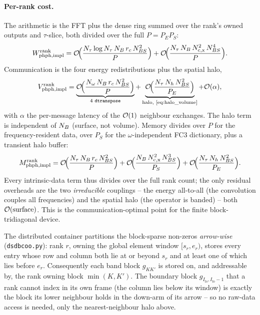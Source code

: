 \paragraph{Per-rank cost.} The arithmetic is the FFT plus the
dense ring summed over the rank's owned outputs and $\tau$-slice,
both divided over the full $P=P_EP_S$:
\begin{equation}\label{eq:cost_phph_impl}
  W^\mathrm{rank}_{\mathrm{phph,impl}}
  = \mathcal{O}\!\Bigl(
      \frac{N_\tau\log N_\tau\,N_{B}\,r_c\,N_{BS}^{2}}{P}
    \Bigr)
  + \mathcal{O}\!\Bigl(
      \frac{N_\tau\,N_{B}\,N_\mathrm{c,x}^{2}\,N_{BS}^{4}}{P}
    \Bigr).
\end{equation}
Communication is the four energy redistributions plus the spatial
halo,
\begin{equation}\label{eq:vol_phph_impl}
  V^\mathrm{rank}_{\mathrm{phph,impl}}
  = \underbrace{\cO\!\Bigl(\frac{N_\omega\,\NB\,r_c\,\NBS^{2}}{P}\Bigr)}_{\text{4 \texttt{dtranspose}}}
  + \underbrace{\cO\!\Bigl(\frac{N_\tau\,N_h\,\NBS^{2}}{P_E}\Bigr)}_{\text{halo, \cref{eq:halo_volume}}}
  + \cO(\alpha),
\end{equation}
with $\alpha$ the per-message latency of the $\mathcal{O}(1)$ neighbour
exchanges. The halo term is independent of $N_{B}$ (surface, not
volume). Memory divides over $P$ for the frequency-resident data,
over $P_S$ for the $\omega$-independent FC3 dictionary, plus a
transient halo buffer:
\begin{equation}\label{eq:mem_phph_impl}
  M^\mathrm{rank}_{\mathrm{phph,impl}}
  = \mathcal{O}\!\Bigl(\frac{N_\tau\,N_{B}\,r_c\,N_{BS}^{2}}{P}\Bigr)
  + \mathcal{O}\!\Bigl(\frac{N_{B}\,N_\mathrm{c,x}^{2}\,N_{BS}^{3}}{P_S}\Bigr)
  + \mathcal{O}\!\Bigl(\frac{N_\tau\,N_h\,N_{BS}^{2}}{P_E}\Bigr).
\end{equation}
Every intrinsic-data term thus divides over the full rank count;
the only residual overheads are the two \emph{irreducible}
couplings -- the energy all-to-all (the convolution couples all
frequencies) and the spatial halo (the operator is banded) -- both
$\mathcal{O}(\text{surface})$. This is the communication-optimal point for
the finite block-tridiagonal device.

\begin{lemma}\label{rem:arrow}
The distributed container partitions the block-sparse non-zeros
\emph{arrow-wise} (\texttt{dsdbcoo.py}): rank $r$, owning the global
element window $[s_r,e_r)$, stores every entry whose row and column
both lie at or beyond $s_r$ and at least one of which lies before
$e_r$. Consequently each band block $g_{KK'}$ is stored on, and
addressable by, the rank owning block $\min(K,K')$. The boundary
block $g_{I_\mathrm{lo},I_\mathrm{lo}-1}$ that a rank cannot index
in its own frame (the column lies below its window) is exactly the
block its lower neighbour holds in the down-arm of its arrow -- so
no raw-data access is needed, only the nearest-neighbour halo above.
\end{lemma}

